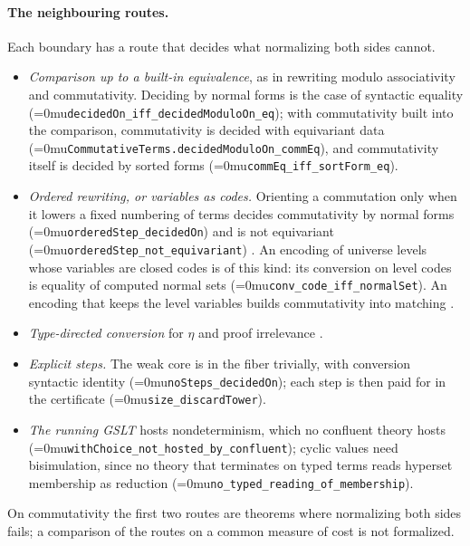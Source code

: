 \documentclass[11pt]{article}
\newcommand{\leanname}[1]{\textup{\Urlmuskip=0mu\relax\nolinkurl{#1}}}
\theoremstyle{definition}
\theoremstyle{remark}
\begin{document}
\paragraph{The neighbouring routes.}
Each boundary has a route that decides what normalizing both sides cannot.
\begin{itemize}[leftmargin=*]
\item \emph{Comparison up to a built-in equivalence}, as in rewriting modulo
  associativity and commutativity. Deciding by normal forms is the case of
  syntactic equality (\leanname{decidedOn_iff_decidedModuloOn_eq}); with
  commutativity built into the comparison, commutativity is decided with
  equivariant data (\leanname{CommutativeTerms.decidedModuloOn_commEq}), and
  commutativity itself is decided by sorted forms
  (\leanname{commEq_iff_sortForm_eq}).
\item \emph{Ordered rewriting, or variables as codes.} Orienting a commutation
  only when it lowers a fixed numbering of terms decides commutativity by normal
  forms (\leanname{orderedStep_decidedOn}) and is not equivariant
  (\leanname{orderedStep_not_equivariant}) \cite{MartinNipkowOrdered}. An
  encoding of universe levels whose variables are closed codes is of this kind:
  its conversion on level codes is equality of computed normal sets
  (\leanname{conv_code_iff_normalSet}). An encoding that keeps the level
  variables builds commutativity into matching \cite{GenestierAgda}.
\item \emph{Type-directed conversion} for $\eta$ and proof irrelevance
  \cite{CoquandConversion,GilbertProofIrrelevance}.
\item \emph{Explicit steps.} The weak core is in the fiber trivially, with
  conversion syntactic identity (\leanname{noSteps_decidedOn}); each step is then
  paid for in the certificate (\leanname{size_discardTower}).
\item \emph{The running GSLT} hosts nondeterminism, which no confluent theory
  hosts (\leanname{withChoice_not_hosted_by_confluent}); cyclic values need
  bisimulation, since no theory that terminates on typed terms reads hyperset
  membership as reduction (\leanname{no_typed_reading_of_membership}).
\end{itemize}
On commutativity the first two routes are theorems where normalizing both sides
fails; a comparison of the routes on a common measure of cost is not
formalized.
\end{document}
